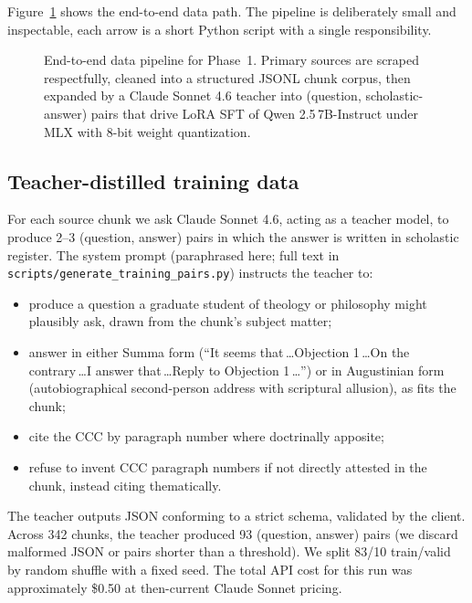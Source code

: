 Figure~\ref{fig:pipeline} shows the end-to-end data path. The pipeline is
deliberately small and inspectable, each arrow is a short Python script
with a single responsibility.

\begin{figure}[H]
\centering

\caption{End-to-end data pipeline for Phase~1. Primary sources are scraped
respectfully, cleaned into a structured JSONL chunk corpus, then expanded
by a Claude Sonnet 4.6 teacher into (question, scholastic-answer) pairs
that drive LoRA SFT of Qwen 2.5\,7B-Instruct under MLX with 8-bit weight
quantization.}
\label{fig:pipeline}
\end{figure}

\subsection{Teacher-distilled training data}
\label{sec:teacher}

For each source chunk we ask Claude Sonnet 4.6, acting as a teacher model,
to produce 2--3 (question, answer) pairs in which the answer is written
in scholastic register. The system prompt (paraphrased here; full text in
\texttt{scripts/generate\_training\_pairs.py}) instructs the teacher to:

\begin{itemize}
  \item produce a question a graduate student of theology or philosophy
        might plausibly ask, drawn from the chunk's subject matter;
  \item answer in either Summa form (``It seems that\,\dots Objection
        1\,\dots On the contrary\,\dots I answer that\,\dots Reply to
        Objection 1\,\dots'') or in Augustinian form (autobiographical
        second-person address with scriptural allusion), as fits the
        chunk;
  \item cite the CCC by paragraph number where doctrinally apposite;
  \item refuse to invent CCC paragraph numbers if not directly attested in
        the chunk, instead citing thematically.
\end{itemize}

The teacher outputs JSON conforming to a strict schema, validated by the
client. Across 342 chunks, the teacher produced 93 (question, answer)
pairs (we discard malformed JSON or pairs shorter than a threshold). We
split 83/10 train/valid by random shuffle with a fixed seed. The
total API cost for this run was approximately \$0.50 at then-current
Claude Sonnet pricing.

